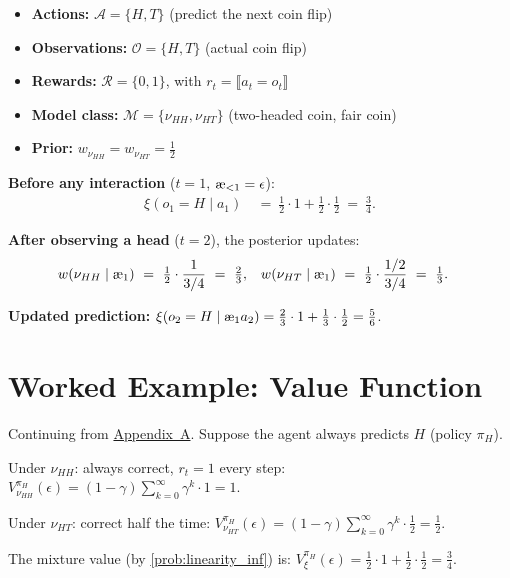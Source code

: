 \documentclass[fontsize=11pt, parskip=half]{scrartcl}
\theoremstyle{definition}
\newcommand{\cA}{\mathcal{A}}
\newcommand{\cO}{\mathcal{O}}
\newcommand{\cR}{\mathcal{R}}
\newcommand{\cM}{\mathcal{M}}
\newcommand{\aes}{\textnormal{\ae}}
\begin{document}
\begin{defbox}[Setup]
\begin{itemize}\itemsep=2pt
\item \textbf{Actions:} $\cA = \{H, T\}$ (predict the next coin flip)
\item \textbf{Observations:} $\cO = \{H, T\}$ (actual coin flip)
\item \textbf{Rewards:} $\cR = \{0, 1\}$, with $r_t = \llbracket a_t = o_t \rrbracket$
\item \textbf{Model class:} $\cM = \{\nu_{HH}, \nu_{HT}\}$ (two-headed coin, fair coin)
\item \textbf{Prior:} $w_{\nu_{HH}} = w_{\nu_{HT}} = \tfrac{1}{2}$
\end{itemize}
\end{defbox}

\textbf{Before any interaction} ($t=1$, $\aes_{<1} = \epsilon$):
\begin{align*}
    \xi(o_1 = H \mid a_1) ~&=~ \tfrac{1}{2} \cdot 1 + \tfrac{1}{2} \cdot \tfrac{1}{2} ~=~ \tfrac{3}{4}.
\end{align*}

\textbf{After observing a head} ($t=2$), the posterior updates:
\begin{align*}
    w(\nu_{HH} \mid \aes_{1}) ~&=~ \tfrac{1}{2} \cdot \frac{1}{3/4} ~=~ \tfrac{2}{3}, &
    w(\nu_{HT} \mid \aes_{1}) ~&=~ \tfrac{1}{2} \cdot \frac{1/2}{3/4} ~=~ \tfrac{1}{3}.
\end{align*}

\textbf{Updated prediction:}
$\xi(o_2 = H \mid \aes_{1} a_2) = \tfrac{2}{3} \cdot 1 + \tfrac{1}{3} \cdot \tfrac{1}{2} = \tfrac{5}{6}$.


\section{Worked Example: Value Function}\label{sec:appendix_value}

Continuing from \hyperref[sec:appendix_mixture]{Appendix~A}. Suppose the agent always predicts $H$ (policy $\pi_H$).

Under $\nu_{HH}$: always correct, $r_t = 1$ every step:
$V_{\nu_{HH}}^{\pi_H}(\epsilon) = (1-\gamma) \sum_{k=0}^\infty \gamma^k \cdot 1 = 1$.

Under $\nu_{HT}$: correct half the time:
$V_{\nu_{HT}}^{\pi_H}(\epsilon) = (1-\gamma) \sum_{k=0}^\infty \gamma^k \cdot \tfrac{1}{2} = \tfrac{1}{2}$.

The mixture value (by \cref{prob:linearity_inf}) is:
$V_\xi^{\pi_H}(\epsilon) = \tfrac{1}{2} \cdot 1 + \tfrac{1}{2} \cdot \tfrac{1}{2} = \tfrac{3}{4}$.
\end{document}

